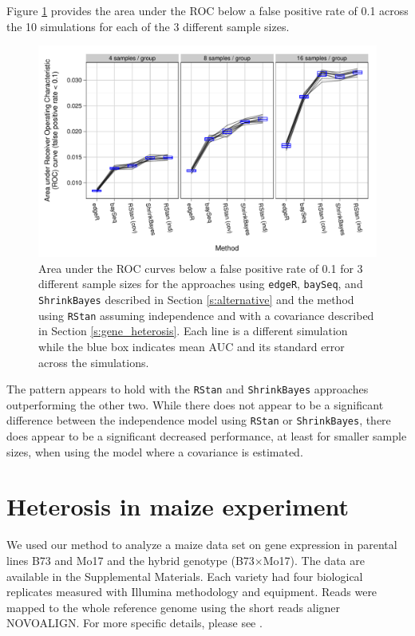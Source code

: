 \documentclass[useAMS,usenatbib,referee]{biom}
\begin{document}
Figure \ref{f:auc} provides the area under the ROC below a false positive rate of 0.1 across the 10 simulations for each of the 3 different sample sizes. 
\begin{figure}
\centerline{\includegraphics[width=\textwidth]{auc-facet-TRUE}}
\caption{Area under the ROC curves below a false positive rate of 0.1 for 3 different sample sizes for the approaches using {\tt edgeR}, {\tt baySeq},  and {\tt ShrinkBayes} described in Section \ref{s:alternative} and the method using {\tt RStan} assuming independence and with a covariance described in Section \ref{s:gene_heterosis}. Each line is a different simulation while the blue box indicates mean AUC and its standard error across the simulations.}
\label{f:auc}
\end{figure}
The pattern appears to hold with the {\tt RStan} and {\tt ShrinkBayes} approaches outperforming the other two. While there does not appear to be a significant difference between the independence model using {\tt RStan} or {\tt ShrinkBayes}, there does appear to be a significant decreased performance, at least for smaller sample sizes, when using the model where a covariance is estimated. 


\section{Heterosis in maize experiment}
\label{s:maize}

We used our method to analyze a maize data set on gene expression in parental lines B73 and Mo17 and the hybrid genotype (B73$\times$Mo17). The data are available in the Supplemental Materials. Each variety had four biological replicates measured with Illumina methodology and equipment. Reads were mapped to the whole reference genome using the short reads aligner NOVOALIGN. For more specific details, please see \cite{paschold2012complementation}. 
\end{document}
